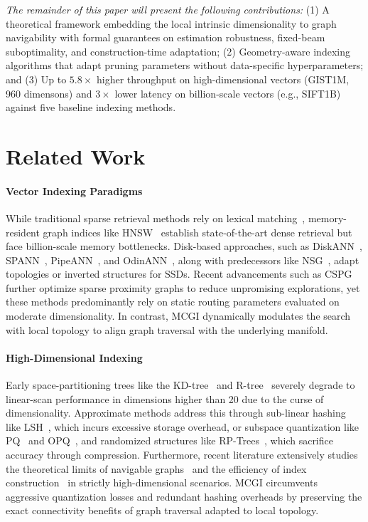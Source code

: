 \documentclass{article}
\theoremstyle{plain}
\theoremstyle{definition}
\theoremstyle{remark}
\begin{document}
\emph{The remainder of this paper will present the following contributions:} (1) A theoretical framework embedding the local intrinsic dimensionality to graph navigability with formal guarantees on estimation robustness, fixed-beam suboptimality, and construction-time adaptation; (2) Geometry-aware indexing algorithms that adapt pruning parameters without data-specific hyperparameters; and (3) Up to $5.8\times$ higher throughput on high-dimensional vectors (GIST1M, 960 dimensons) and $3\times$ lower latency on billion-scale vectors (e.g., SIFT1B) against five baseline indexing methods.

\section{Related Work}
\label{sec:related_work}

\paragraph{Vector Indexing Paradigms}
While traditional sparse retrieval methods rely on lexical matching~\cite{robertson2009probabilistic}, memory-resident graph indices like HNSW~\cite{malkov2018efficient} establish state-of-the-art dense retrieval but face billion-scale memory bottlenecks. Disk-based approaches, such as DiskANN~\cite{subramanya2019diskann}, SPANN~\cite{chen2021spann}, PipeANN~\cite{osdi25pipeann}, and OdinANN~\cite{fast26odinann}, along with predecessors like NSG~\cite{fu2019nsg}, adapt topologies or inverted structures for SSDs. Recent advancements such as CSPG~\cite{NEURIPS2024_bab1486c} further optimize sparse proximity graphs  to reduce unpromising explorations, yet these methods predominantly rely on static routing parameters evaluated on moderate dimensionality. In contrast, MCGI dynamically modulates the search with local topology to align graph traversal with the underlying manifold.

\paragraph{High-Dimensional Indexing}
Early space-partitioning trees like the KD-tree~\cite{bentley1975multidimensional} and R-tree~\cite{guttman1984r} severely degrade to linear-scan performance in dimensions higher than 20 due to the curse of dimensionality. Approximate methods address this through sub-linear hashing like LSH~\cite{indyk1998approximate, datar2004locality}, which incurs excessive storage overhead, or subspace quantization like PQ~\cite{jegou2011product} and OPQ~\cite{ge2013optimized}, and randomized structures like RP-Trees~\cite{dasgupta2008random}, which sacrifice accuracy through compression. Furthermore, recent literature extensively studies the theoretical limits of navigable graphs~\cite{NEURIPS2024_6dc63b40} and the efficiency of index construction~\cite{10.14778/3594512.3594527} in strictly high-dimensional scenarios. MCGI circumvents aggressive quantization losses and redundant hashing overheads by preserving the exact connectivity benefits of graph traversal adapted to local topology.
\end{document}
